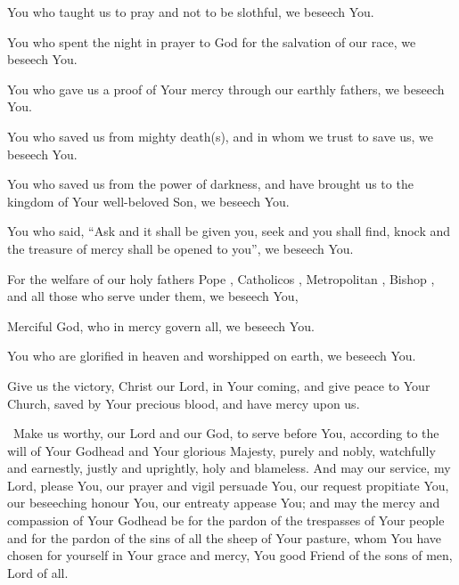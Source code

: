 \documentclass[12pt,twoside,a5paper]{article}
\begin{document}
\begin{halfparskip}
   You who taught us to pray and not to be slothful, we beseech You.

  You who spent the night in prayer to God for the salvation of our race, we beseech You.

  You who gave us a proof of Your mercy through our earthly fathers, we beseech You.

  You who saved us from mighty death(s), and in whom we trust to save us, we beseech You.

  You who saved us from the power of darkness, and have brought us to the kingdom of Your well-beloved Son, we beseech You.

  You who said, ``Ask and it shall be given you, seek and you shall find, knock and the treasure of mercy shall be opened to you'', we beseech You.
\end{halfparskip}

\begin{halfparskip}
   For the welfare of our holy fathers Pope \NN , Catholicos \NN , Metropolitan \NN , Bishop \NN , and all those who serve under them, we beseech You,

  Merciful God, who in mercy govern all, we beseech You.

  You who are glorified in heaven and worshipped on earth, we beseech You.

  Give us the victory, Christ our Lord, in Your coming, and give peace to Your Church, saved by Your precious blood, and have mercy upon us.
\end{halfparskip}


\cc~Make us worthy, our Lord and our God, to serve before You, according to the will of Your Godhead and Your glorious Majesty, purely and nobly, watchfully and earnestly, justly and uprightly, holy and blameless. And may our service, my Lord, please You, our prayer and vigil persuade You, our request propitiate You, our beseeching honour You, our entreaty appease You; and may the mercy and compassion of Your Godhead be for the pardon of the trespasses of Your people and for the pardon of the sins of all the sheep of Your pasture, whom You have chosen for yourself in Your grace and mercy, You good Friend of the sons of men, Lord of all.
\end{document}

